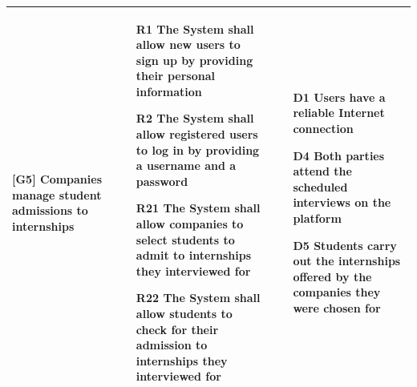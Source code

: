 \begin{longtable}{|p{4cm}|p{5.5cm}|p{5.5cm}|}
        \textbf{[G5] \newline Companies manage student admissions to internships} & 
    \begin{itemize}[label=$\bullet$]
        \item [R1] The System shall allow new users to sign up by providing their personal information
        \item [R2] The System shall allow registered users to log in by providing a username and a password
        \item [R21] The System shall allow companies to select students to admit to internships they interviewed for
        \item [R22] The System shall allow students to check for their admission to internships they interviewed for
    \end{itemize}
    &
    \begin{itemize}[label=$\bullet$]
        \item [D1] Users have a reliable Internet connection
        \item [D4] Both parties attend the scheduled interviews on the platform
        \item [D5] Students carry out the internships offered by the companies they were chosen for
    \end{itemize} \\ 
    \hline


\end{longtable}
